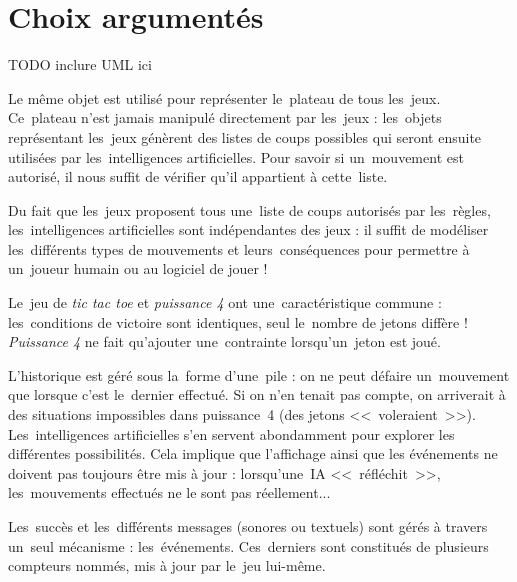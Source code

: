 \section{Choix argumentés}
TODO inclure UML ici

Le même objet est utilisé pour représenter le~plateau de tous les~jeux. Ce~plateau n'est jamais manipulé directement par les~jeux : les~objets représentant les~jeux génèrent des listes de coups possibles qui seront ensuite utilisées par les~intelligences artificielles. Pour savoir si un~mouvement est autorisé, il nous suffit de vérifier qu'il appartient à cette~liste. 

Du fait que les~jeux proposent tous une~liste de coups autorisés par les~règles, les~intelligences artificielles sont indépendantes des jeux : il suffit de modéliser les~différents types de mouvements et leurs~conséquences pour permettre à un~joueur humain ou au logiciel de jouer !

Le~jeu de \textit{tic tac toe} et \textit{puissance 4} ont une~caractéristique commune : les~conditions de victoire sont identiques, seul le~nombre de jetons diffère ! \textit{Puissance 4} ne fait qu'ajouter une~contrainte lorsqu'un~jeton est joué.

L'historique est géré sous la~forme d'une~pile : on ne peut défaire un~mouvement que lorsque c'est le~dernier effectué. Si on n'en tenait pas compte, on arriverait à des situations impossibles dans puissance~4 (des jetons <<~voleraient~>>). Les~intelligences artificielles s'en servent abondamment pour explorer les différentes possibilités. Cela implique que l'affichage ainsi que les événements ne doivent pas toujours être mis à jour : lorsqu'une~IA <<~réfléchit~>>, les~mouvements effectués ne le sont pas réellement...

Les~succès et les~différents messages (sonores ou textuels) sont gérés à travers un~seul mécanisme : les~événements. Ces~derniers sont constitués de plusieurs compteurs nommés, mis à jour par le~jeu lui-même. 